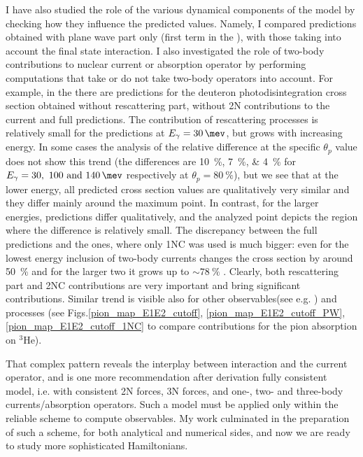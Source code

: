 I have also studied the role of the various dynamical components of the model by checking 
how they influence the predicted values.
Namely, I compared predictions obtained with plane wave part only (first term in the ),
with those taking into account the final state interaction.
I also investigated the role of two-body contributions to nuclear current or absorption operator
by performing computations that take or do not take two-body operators into account.
For example, in the  there are predictions for the deuteron photodisintegration 
cross section obtained 
without rescattering part, without 2N contributions to the current and full predictions.
The contribution of rescattering processes is relatively small for the predictions at $E_\gamma = \SI{30}{\mev}$,
but grows with increasing energy. In some cases the analysis of the relative difference at the specific 
$\theta_p$ value does not show this trend (the differences are \SIlist{10;7;4}{\percent} 
for $E_\gamma=\SIlist[list-units = single]{30;100;140}{\mev}$ respectively at $\theta_p=\SI{80}{\percent}$),
but we see that
at the lower energy, all predicted cross section values are qualitatively very similar and they differ
mainly around the maximum point.
In contrast, for the larger energies, predictions differ qualitatively, and the analyzed point 
depicts the region where the difference is relatively small.
The discrepancy between the full predictions and the ones, where only 1NC was used is much bigger:
even for the lowest energy inclusion of two-body currents changes the cross section 
by around \SI{50}{\percent} and for the larger two it grows up to $\sim\SI{78}{\percent}$ .
Clearly, both rescattering part and 2NC contributions are very important and bring significant contributions.
Similar trend is visible also for other observables(see e.g. ) and processes 
(see Figs.\ref{pion_map_E1E2_cutoff}, \ref{pion_map_E1E2_cutoff_PW}, \ref{pion_map_E1E2_cutoff_1NC}
to compare contributions for the pion absorption on $^3$He).

That complex pattern reveals the interplay between interaction and the current operator, and
is one more recommendation after derivation fully consistent model, i.e. with consistent 2N
forces, 3N forces, and one-, two- and three-body currents/absorption operators.
Such a model must be applied only within the reliable scheme to compute observables.
My work culminated in the preparation of such a scheme, for both analytical and numerical
sides, and now we are ready to study more sophisticated Hamiltonians.

